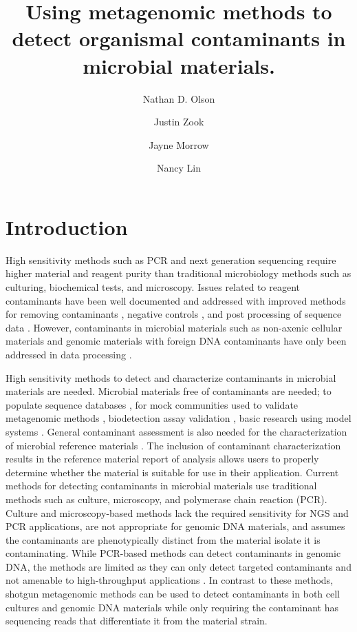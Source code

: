 \documentclass[fleqn,10pt,lineno]{wlpeerj}\usepackage[]{graphicx}\usepackage[]{color}
\title{Using metagenomic methods to detect organismal contaminants in microbial materials.}
\author[1]{Nathan D. Olson}
\author[1]{Justin Zook}
\author[1]{Jayne Morrow}
\author[1]{Nancy Lin}
\affil[1]{Material Measurement Laboratory, National Institute of Standards and Technology}
\begin{document}
\flushbottom
\maketitle
\thispagestyle{empty}

\section*{Introduction}
High sensitivity methods such as PCR and next generation sequencing require higher material and reagent purity than traditional microbiology methods such as culturing, biochemical tests, and microscopy. 
Issues related to reagent contaminants have been well documented and addressed with improved methods for removing contaminants \citep{woyke2011decontamination,motley2014improved}, negative controls \citep{jervis2015deriving}, and post processing of sequence data \citep{mukherjee2015large}. 
However, contaminants in microbial materials such as non-axenic cellular materials and genomic materials with foreign DNA contaminants have only been addressed in data processing \citep{Shrestha2013,tennessen2015prodege}. 

High sensitivity methods to detect and characterize contaminants in microbial materials are needed.  
Microbial materials free of contaminants are needed; to populate sequence databases \citep{parks2015checkm}, for mock communities used to validate metagenomic methods \citep{bokulich2016mockrobiota}, biodetection assay validation \citep{Ieven2013,International2011}, basic research using model systems \citep{Shrestha2013}. 
General contaminant assessment is also needed for the characterization of microbial reference materials \citep{olson2016pepr}. 
The inclusion of contaminant characterization results in the reference material report of analysis allows users to properly determine whether the material is suitable for use in their application. 
Current methods for detecting contaminants in microbial materials use traditional methods such as culture, microscopy, and polymerase chain reaction (PCR). 
Culture and microscopy-based methods lack the required sensitivity for NGS and PCR applications, are not appropriate for genomic DNA materials, and assumes the contaminants are phenotypically distinct from the material isolate it is contaminating. 
While PCR-based methods can detect contaminants in genomic DNA, the methods are limited as they can only detect targeted contaminants and not amenable to high-throughput applications \citep{heck2016evaluating,Marron2013}. 
In contrast to these methods, shotgun metagenomic methods can be used to detect contaminants in both cell cultures and genomic DNA materials while only requiring the contaminant has sequencing reads that differentiate it from the material strain. 
\end{document}
